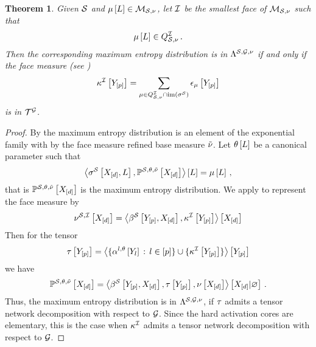 \documentclass[aps,onecolumn,nofootinbib,pra]{article}
\newtheorem{theorem}{Theorem}
\begin{document}
    \begin{theorem}
        \label{the:tnRepresentationMaxEntropy}
        Given $\mathcal{S}$ and $\mu\left[L\right]\in\mathcal{M}_{\mathcal{S},\nu}$, let $\mathcal{I}$ be the smallest face of $\mathcal{M}_{\mathcal{S},\nu}$ such that
        \begin{align*}
            \mu\left[L\right] \in Q^{\mathcal{I}}_{\mathcal{S},\nu} \, .
        \end{align*}
        Then the corresponding maximum entropy distribution is in $\Lambda^{\mathcal{S},\mathcal{G},\nu}$ if and only if the face measure (see )
        \begin{align*}
            \kappa^{\mathcal{I}}\left[Y_{[p]}\right]
            = \sum_{\mu\in Q^{\mathcal{I}}_{\mathcal{S},\nu}\cap\mathrm{im}\left(\sigma^{\mathcal{S}}\right)} \epsilon_{\mu}\left[Y_{[p]}\right]
        \end{align*}
        is in $\mathcal{T}^{\mathcal{G}}$.
    \end{theorem}
    \begin{proof}
        By  the maximum entropy distribution is an element of the exponential family with by the face measure refined base measure $\tilde{\nu}$.
        Let $\theta\left[L\right]$ be a canonical parameter such that
        \begin{align*}
            \left\langle \sigma^{\mathcal{S}}\left[X_{[d]},L\right],\mathbb{P}^{\mathcal{S},\theta,\tilde{\nu}}\left[X_{[d]}\right]\right\rangle \left[ L \right] = \mu\left[L\right] \, ,
        \end{align*}
        that is $\mathbb{P}^{\mathcal{S},\theta,\tilde{\nu}}\left[X_{[d]}\right]$ is the maximum entropy distribution.
        We apply  to represent the face measure by
        \begin{align*}
            \nu^{\mathcal{S},\mathcal{I}}\left[X_{[d]}\right] =
            \left\langle \beta^{\mathcal{S}}\left[Y_{[p]},X_{[d]}\right],\kappa^{\mathcal{I}}\left[Y_{[p]}\right]\right\rangle \left[ X_{[d]} \right]
        \end{align*}
        Then for the tensor
        \begin{align*}
            \tau\left[Y_{[p]}\right]
            = \left\langle 
                \{\alpha^{l,\theta}\left[Y_{l}\right]\,:\,l\in[p]\}
                \cup\{\kappa^{\mathcal{I}}\left[Y_{[p]}\right]\}\right\rangle \left[ Y_{[p]} \right]
        \end{align*}
        we have
        \begin{align*}
            \mathbb{P}^{\mathcal{S},\theta,\tilde{\nu}}\left[X_{[d]}\right]
            = \left\langle 
                \beta^{\mathcal{S}}\left[Y_{[p]},X_{[d]}\right], \tau\left[Y_{[p]}\right], \nu\left[X_{[d]}\right]
            \right\rangle \left[ X_{[d]} | \varnothing \right] \, .
        \end{align*}
        Thus, the maximum entropy distribution is in $\Lambda^{\mathcal{S},\mathcal{G},\nu}$, if $\tau$ admits a tensor network decomposition with respect to $\mathcal{G}$.
        Since the hard activation cores are elementary, this is the case when $\kappa^{\mathcal{I}}$ admits a tensor network decomposition with respect to $\mathcal{G}$.
    \end{proof}
\end{document}
